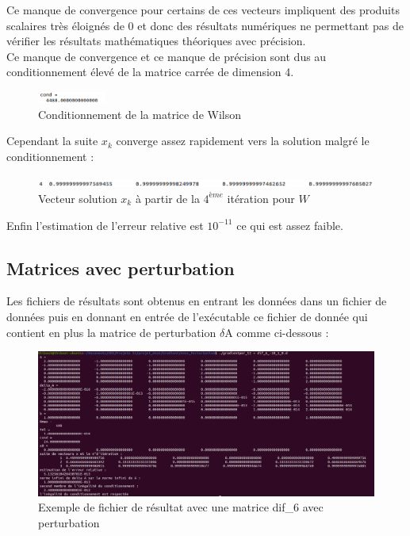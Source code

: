 \documentclass[12,french]{report}
\begin{document}
Ce manque de convergence pour certains de ces vecteurs impliquent des produits scalaires très éloignés de 0 et donc des résultats numériques ne permettant pas de vérifier les résultats mathématiques théoriques avec précision.\\

Ce manque de convergence et ce manque de précision sont dus au conditionnement élevé de la matrice carrée de dimension 4.\\

\begin{figure}[H]
	\centering
	\includegraphics[width=0.2\textwidth]{./Images/Conditionnement_W}
	\caption{Conditionnement de la matrice de Wilson}
\end{figure}\vspace{0.2cm}

Cependant la suite $x_k$ converge assez rapidement vers la solution malgré le conditionnement :\\

\begin{figure}[H]
	\centering
	\includegraphics[width=1\textwidth]{./Images/x_W}
	\caption{Vecteur solution $x_k$ à partir de la $4^{ème}$ itération pour $W$}
\end{figure}\vspace{0.2cm}

Enfin l'estimation de l'erreur relative est $10^{-11}$ ce qui est assez faible. 

\subsection{Matrices avec perturbation}

Les fichiers de résultats sont obtenus en entrant les données dans un fichier de données puis en donnant en entrée de l’exécutable ce fichier de donnée qui contient en plus la matrice de perturbation $\delta$A comme ci-dessous :
\begin{figure}[H]
	\centering
	\includegraphics[width=1\textwidth]{./Images/dif_6_1.res}
	\caption{Exemple de fichier de résultat avec une matrice dif\_6 avec perturbation}
\end{figure}
\end{document}
